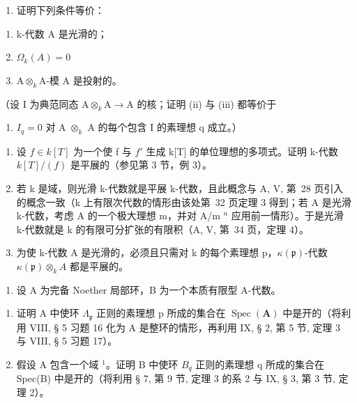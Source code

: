 \begin{enumerate}
\def\labelenumi{\alph{enumi})}
\tightlist
\item
  证明下列条件等价：
\end{enumerate}

\begin{enumerate}
\def\labelenumi{(\roman{enumi})}
\item
  k-代数 A 是光滑的；
\item
  \(\Omega_k(A) = 0\)
\item
  \(\mathrm{A}\otimes_{k}\mathrm{A}\)-模 A 是投射的。
\end{enumerate}

（设 I 为典范同态 \(\mathrm{A} \otimes_k \mathrm{A} \to \mathrm{A}\) 的核；证明 (ii) 与 (iii) 都等价于

\begin{enumerate}
\def\labelenumi{(\roman{enumi})}
\setcounter{enumi}{3}
\tightlist
\item
  \(I_{q} = 0\) 对 A \(\otimes_{k}\) A 的每个包含 I 的素理想 q 成立。）
\end{enumerate}

\begin{enumerate}
\def\labelenumi{\alph{enumi})}
\setcounter{enumi}{1}
\item
  设 \(f \in k[T]\) 为一个使 f 与 \(f'\) 生成 k{[}T{]} 的单位理想的多项式。证明 k-代数 \(k[T]/(f)\) 是平展的（参见第 3 节，例 3）。
\item
  若 k 是域，则光滑 k-代数就是平展 k-代数，且此概念与 A, V, 第~28 页引入的概念一致（k 上有限次代数的情形由该处第~32 页定理 3 得到；若 A 是光滑 k-代数，考虑 A 的一个极大理想 m，并对 A/m \(^{n}\) 应用前一情形）。于是光滑 k-代数就是 k 的有限可分扩张的有限积（A, V, 第~34 页，定理 4）。
\item
  为使 k-代数 A 是光滑的，必须且只需对 k 的每个素理想 p，\(\kappa(\mathfrak{p})\)-代数 \(\kappa(\mathfrak{p})\otimes_{k}A\) 都是平展的。
\end{enumerate}

\begin{enumerate}
\def\labelenumi{\arabic{enumi})}
\setcounter{enumi}{4}
\tightlist
\item
  设 A 为完备 Noether 局部环，B 为一个本质有限型 A-代数。
\end{enumerate}

\begin{enumerate}
\def\labelenumi{\alph{enumi})}
\item
  证明 A 中使环 \(\Lambda_{\mathfrak{p}}\) 正则的素理想 p 所成的集合在 \(\operatorname{Spec}(\mathbf{A})\) 中是开的（将利用 VIII, § 5 习题 16 化为 A 是整环的情形，再利用 IX, § 2, 第 5 节, 定理 3 与 VIII, § 5 习题 17）。
\item
  假设 A 包含一个域 \(^{1}\)。证明 B 中使环 \(B_{q}\) 正则的素理想 q 所成的集合在 Spec(B) 中是开的（将利用 § 7, 第 9 节, 定理 3 的系 2 与 IX, § 3, 第 3 节, 定理 2）。
\end{enumerate}

